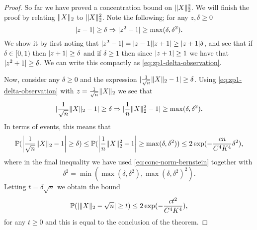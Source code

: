 \documentclass{article}
\begin{document}
\begin{proof}
  So far we have proved a concentration bound on \(\norm{X}_{2}^{2}\). We will
  finish the proof by relating \(\norm{X}_{2}\) to \(\norm{X}_{2}^{2}\). Note
  the following; for any \(z, \delta \geq 0\)
  \begin{equation}
    \label{eq:zp1-delta-observation}
    \abs{z - 1} \geq \delta \Rightarrow \abs{z^{2} - 1} \geq \max(\delta, \delta^{2}).
  \end{equation}
  We show it by first noting that
  \(\abs{z^{2} - 1} = \abs{z - 1}\abs{z + 1} \geq \abs{z + 1}\delta\), and see
  that if \(\delta \in [0, 1)\) then \(\abs{z + 1} \geq \delta\) and if
  \(\delta \geq 1\) then since \(\abs{z + 1} \geq 1\) we have that
  \(\abs{z^{2} + 1} \geq \delta\). We can write this compactly as
  \cref{eq:zp1-delta-observation}.

  Now, consider any \(\delta \geq 0\) and the expression
  \(\abs{\frac{1}{\sqrt{n}}\norm{X}_{2} - 1} \geq \delta\). Using
  \cref{eq:zp1-delta-observation} with \(z = \frac{1}{\sqrt{n}}\norm{X}_{2}\) we
  see that
  \begin{equation}
    \label{eq:4}
    \abs{\frac{1}{\sqrt{n}}\norm{X}_{2} - 1} \geq \delta \Rightarrow \abs{\frac{1}{n}\norm{X}^{2}_{2} - 1} \geq \max(\delta, \delta^{2}).
  \end{equation}
  In terms of events, this means that
  \begin{equation}
    \Pr(\abs*{\frac{1}{\sqrt{n}}\norm{X}_{2} - 1} \geq \delta) \leq \Pr(\abs*{\frac{1}{n}\norm{X}^{2}_{2} - 1} \geq \max(\delta, \delta^{2})) \leq 2 \exp(-\frac{cn}{C^{4}K^{4}}\delta^{2}),
  \end{equation}
  where in the final inequality we have used \cref{eq:conc-norm-bernstein}
  together with
  \begin{equation}
    \delta^{2} = \min(\max(\delta, \delta^{2}), \max(\delta, \delta^{2})^{2}).
  \end{equation}
  Letting \(t = \delta \sqrt{n}\) we obtain the bound
  \begin{equation}
    \Pr(\abs{\norm{X}_{2} - \sqrt{n}} \geq t) \leq 2\exp(-\frac{ct^{2}}{C^{4}K^{4}}),
  \end{equation}
  for any \(t \geq 0\) and this is equal to the conclusion of the theorem.
\end{proof}
\end{document}
